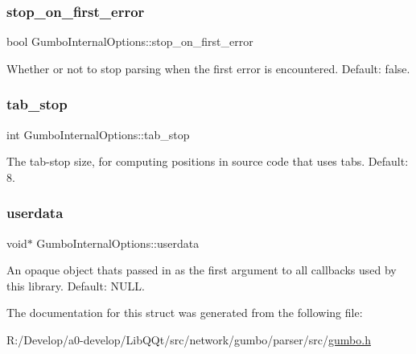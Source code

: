 \subsubsection{\texorpdfstring{stop\+\_\+on\+\_\+first\+\_\+error}{stop\_on\_first\_error}}
{\footnotesize\ttfamily bool Gumbo\+Internal\+Options\+::stop\+\_\+on\+\_\+first\+\_\+error}

Whether or not to stop parsing when the first error is encountered. Default\+: false. \mbox{\label{struct_gumbo_internal_options_aa355be463e9592c127b2a1ef056f6ebe}} 
\subsubsection{\texorpdfstring{tab\+\_\+stop}{tab\_stop}}
{\footnotesize\ttfamily int Gumbo\+Internal\+Options\+::tab\+\_\+stop}

The tab-\/stop size, for computing positions in source code that uses tabs. Default\+: 8. \mbox{\label{struct_gumbo_internal_options_ab0614a8d24cd66f81028402531ba436a}} 
\subsubsection{\texorpdfstring{userdata}{userdata}}
{\footnotesize\ttfamily void$\ast$ Gumbo\+Internal\+Options\+::userdata}

An opaque object that\textquotesingle{}s passed in as the first argument to all callbacks used by this library. Default\+: N\+U\+LL. 

The documentation for this struct was generated from the following file\+:\begin{DoxyCompactItemize}
\item 
R\+:/\+Develop/a0-\/develop/\+Lib\+Q\+Qt/src/network/gumbo/parser/src/\mbox{\hyperlink{gumbo_8h}{gumbo.\+h}}\end{DoxyCompactItemize}
